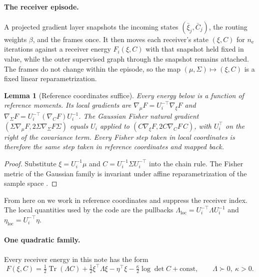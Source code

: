 \documentclass[11pt]{article}
\newtheorem{lemma}[proposition]{Lemma}
\theoremstyle{definition}
\theoremstyle{remark}
\newcommand{\Tr}{\operatorname{Tr}}
\begin{document}
\paragraph{The receiver episode.}
A projected gradient layer snapshots the incoming states $(\bar\xi_j,\bar C_j)$, the routing weights $\beta$, and the frames once. It then moves each receiver's state $(\xi,C)$ for $n_{\mathrm e}$ iterations against a receiver energy $F_i(\xi,C)$ with that snapshot held fixed in value, while the outer supervised graph through the snapshot remains attached. The frames do not change within the episode, so the map $(\mu,\Sigma)\mapsto(\xi,C)$ is a fixed linear reparametrization.

\begin{lemma}[Reference coordinates suffice]
\label{lem:reference}
Every energy below is a function of reference moments. Its local gradients are $\nabla_\mu F=U_i^{-\top}\nabla_\xi F$ and $\nabla_\Sigma F=U_i^{-\top}(\nabla_CF)U_i^{-1}$. The Gaussian Fisher natural gradient $(\Sigma\nabla_\mu F,2\Sigma\nabla_\Sigma F\Sigma)$ equals $U_i$ applied to $(C\nabla_\xi F,2C\nabla_CF\,C)$, with $U_i^\top$ on the right of the covariance term. Every Fisher step taken in local coordinates is therefore the same step taken in reference coordinates and mapped back.
\end{lemma}

\begin{proof}
Substitute $\xi=U_i^{-1}\mu$ and $C=U_i^{-1}\Sigma U_i^{-\top}$ into the chain rule. The Fisher metric of the Gaussian family is invariant under affine reparametrization of the sample space \citep{amari1998natural}.
\end{proof}

From here on we work in reference coordinates and suppress the receiver index. The local quantities used by the code are the pullbacks $\Lambda_{\mathrm{loc}}=U_i^{-\top}\Lambda U_i^{-1}$ and $\eta_{\mathrm{loc}}=U_i^{-\top}\eta$.

\paragraph{One quadratic family.}
Every receiver energy in this note has the form
\begin{equation}
F(\xi,C)=\tfrac12\Tr(\Lambda C)+\tfrac12\xi^\top\Lambda\xi-\eta^\top\xi-\tfrac{\kappa}{2}\log\det C+\text{const},
\qquad \Lambda\succ0,\ \kappa>0.
\label{eq:quadratic_family}
\end{equation}
\end{document}
